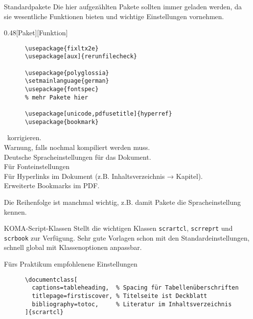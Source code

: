\begin{frame}[fragile]{Standardpakete}
  Die hier aufgezählten Pakete sollten immer geladen werden, da sie wesentliche Funktionen bieten und wichtige Einstellungen vornehmen.
  \begin{CodeExample}{0.48}[Paket][Funktion]
    \begin{lstlisting}
      \usepackage{fixltx2e}
      \usepackage[aux]{rerunfilecheck}

      \usepackage{polyglossia}
      \setmainlanguage{german}
      \usepackage{fontspec}
      % mehr Pakete hier

      \usepackage[unicode,pdfusetitle]{hyperref}
      \usepackage{bookmark}
    \end{lstlisting}
  \CodeResult
    \LaTeXe\ korrigieren. \\
    Warnung, falls nochmal kompiliert werden muss. \\
    Deutsche Spracheinstellungen für das Dokument. \\
    Für Fonteinstellungen \\[2\baselineskip]
    Für Hyperlinks im Dokument (z.B. Inhaltsverzeichnis → Kapitel). \\
    Erweiterte Bookmarks im PDF.
  \end{CodeExample}

  \vspace{5pt}
  Die Reihenfolge ist manchmal wichtig, z.B. damit Pakete die Spracheinstellung kennen.
\end{frame}

\begin{frame}[fragile]{
  KOMA-Script-Klassen
  \hfill{}
}
  Stellt die wichtigen Klassen \texttt{scrartcl}, \texttt{scrreprt} und \texttt{scrbook} zur Verfügung.
  Sehr gute Vorlagen schon mit den Standardeinstellungen, schnell global mit Klassenoptionen anpassbar.
  \begin{block}{Fürs Praktikum empfohlenene Einstellungen}
    \begin{lstlisting}
      \documentclass[
        captions=tableheading,  % Spacing für Tabellenüberschriften
        titlepage=firstiscover, % Titelseite ist Deckblatt
        bibliography=totoc,     % Literatur im Inhaltsverzeichnis
      ]{scrartcl}
    \end{lstlisting}
  \end{block}
\end{frame}

